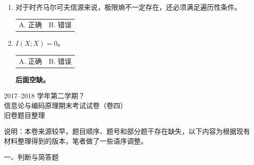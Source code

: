 \documentclass[UTF8,a4paper,12pt]{ctexart}
\begin{document}
\begin{enumerate}[label=\arabic*., leftmargin=2em, itemsep=1.4em]
\item 对于时齐马尔可夫信源来说，极限熵不一定存在，还必须满足遍历性条件。

\begin{tabular}{@{}p{}p{}@{}}
A. 正确 & B. 错误
\end{tabular}

\item $I(X;X)=0$。

\begin{tabular}{@{}p{}p{}@{}}
A. 正确 & B. 错误
\end{tabular}

\vspace{5em}

\textbf{后面空缺。}

\end{enumerate}

\newpage

\begin{center}
    {\heiti{} 2017--2018 学年第二学期？}\\[0.5em]
    {\heiti{} 信息论与编码原理期末考试试卷（卷四）}\\[0.5em]
    {\heiti{} 旧卷题目整理}
\end{center}

\vspace{1em}

\noindent
说明：本卷来源较早，题目顺序、题号和部分题干存在缺失，以下内容为根据现有材料整理得到的版本，笔者做了一些语序调整。

\vspace{1em}


\noindent
{\heiti 一、判断与简答题}

\vspace{0.5em}
\end{document}
